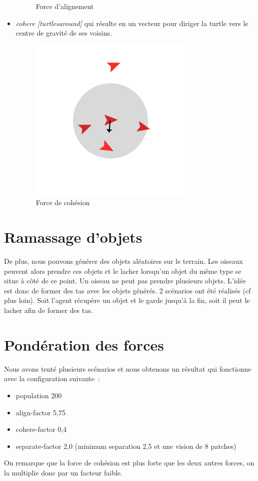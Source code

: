 \documentclass{article}
\begin{document}
\begin{itemize}
\begin{figure}[h]
\begin{center}
  		\caption{Force d'alignement}
  		\label{fig:align}
  	\end{center}
  \end{figure}
  \item \emph{cohere [turtlesaround]} qui résulte en un vecteur pour diriger la turtle vers le centre de gravité de ses voisins.
  \begin{figure}[h]
  	\begin{center}
  		\includegraphics[scale=0.3]{img/cohere}
  		\caption{Force de cohésion}
  		\label{fig:cohere}
  	\end{center}
  \end{figure}
\end{itemize}

\section{Ramassage d'objets}

De plus, nous pouvons générer des objets aléatoires sur le terrain. Les oiseaux peuvent alors prendre ces objets et le lacher lorsqu'un objet du même type se situe à côté de ce point. Un oiseau ne peut pas prendre plusieurs objets. L'idée est donc de former des tas avec les objets générés.
2 scénarios ont été réalisés (cf plus loin). Soit l'agent récupère un objet et le garde jusqu'à la fin, soit il peut le lacher afin de former des tas.

\section{Pondération des forces}

Nous avons tenté plusieurs scénarios et nous obtenons un résultat qui fonctionne avec la configuration suivante~:
\begin{itemize}
  \item population 200
  \item align-factor 5,75
  \item cohere-factor 0,4
  \item separate-factor 2,0 (minimum separation 2,5 et une vision de 8 patches)
\end{itemize}
On remarque que la force de cohésion est plus forte que les deux autres forces, on la multiplie donc par un facteur faible.
\end{document}

